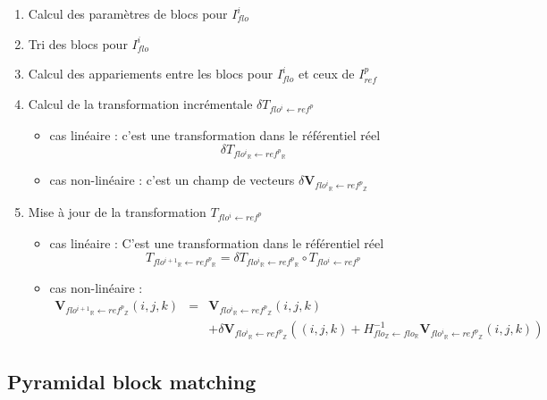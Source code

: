 \documentclass[10pt]{report}
\newcommand{\ens}[4]{ {#1}_{\mathbb{#2}} \leftarrow {#3}_{\mathbb{#4}} }
\begin{document}
\begin{itemize}
\begin{enumerate}
\item Calcul des param\`etres de blocs pour $I^i_{flo}$

\item Tri des blocs pour $I^i_{flo}$

\item Calcul des appariements entre les blocs pour $I^i_{flo}$ et ceux de $I^p_{ref}$

\item Calcul de la transformation incrémentale
$\delta T_{\ens{flo^i}{}{ref^p}{}}$ 
\begin{itemize}
\item cas lin\'eaire : c'est une transformation dans le r\'ef\'erentiel r\'eel
$$\delta T_{\ens{flo^i}{R}{ref^p}{R}}$$
\item cas non-lin\'eaire : c'est un champ de vecteurs
$\delta\mathbf{V}_{\ens{flo^i}{R}{ref^p}{Z}}$
\end{itemize}

\item Mise \`a jour de la  transformation 
$T_{\ens{flo^i}{}{ref^p}{}}$ 
\begin{itemize}
\item cas lin\'eaire : C'est une transformation dans le r\'ef\'erentiel r\'eel
$$
T_{\ens{flo^{i+1}}{R}{ref^p}{R}} = 
\delta T_{\ens{flo^i}{R}{ref^p}{R}} \circ T_{\ens{flo^i}{}{ref^p}{}} 
$$
\item cas non-lin\'eaire :
\begin{eqnarray*}
\mathbf{V}_{\ens{flo^{i+1}}{R}{ref^p}{Z}} (i,j,k) & = &
\mathbf{V}_{\ens{flo^{i}}{R}{ref^p}{Z}} (i,j,k) \\
&& + 
\delta\mathbf{V}_{\ens{flo^i}{R}{ref^p}{Z}} 
\left( (i,j,k) + H^{-1}_{\ens{flo}{Z}{flo}{R}} \mathbf{V}_{\ens{flo^{i}}{R}{ref^p}{Z}} (i,j,k) \right)
\end{eqnarray*}

\end{itemize}

\end{enumerate}
\end{itemize}



\subsection{Pyramidal block matching}
\end{document}
